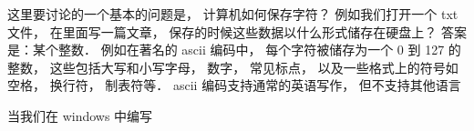 
这里要讨论的一个基本的问题是， 计算机如何保存字符？ 例如我们打开一个 txt 文件， 在里面写一篇文章， 保存的时候这些数据以什么形式储存在硬盘上？ 答案是：某个整数． 例如在著名的 ascii 编码中， 每个字符被储存为一个 0 到 127 的整数， 这些包括大写和小写字母， 数字， 常见标点， 以及一些格式上的符号如空格， 换行符， 制表符等． ascii 编码支持通常的英语写作， 但不支持其他语言

当我们在 windows 中编写
